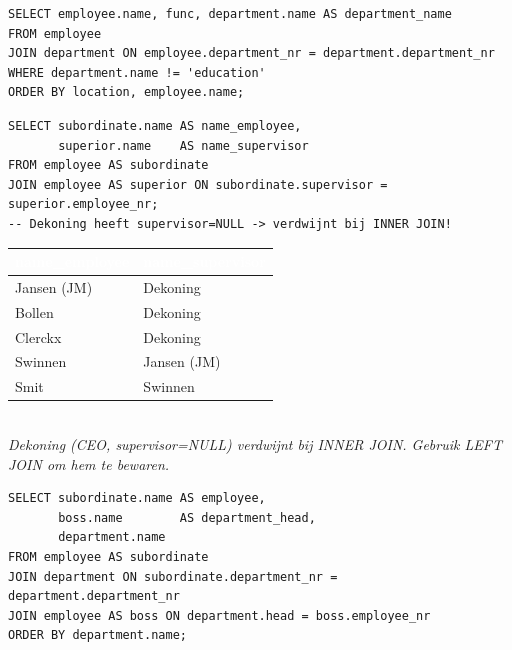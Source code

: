 \documentclass[10pt,a4paper]{article}
\newcommand{\TBLH}[1]{\textbf{\textcolor{white}{#1}}}
\begin{document}
\begin{tcolorbox}[sqlbox,title=Employees + department naam]
\begin{lstlisting}
SELECT employee.name, func, department.name AS department_name
FROM employee
JOIN department ON employee.department_nr = department.department_nr
WHERE department.name != 'education'
ORDER BY location, employee.name;
\end{lstlisting}
\end{tcolorbox}

\begin{tcolorbox}[sqlbox,title=Zelfrelatie --- employee met zijn supervisor (alias verplicht!)]
\begin{lstlisting}
SELECT subordinate.name AS name_employee,
       superior.name    AS name_supervisor
FROM employee AS subordinate
JOIN employee AS superior ON subordinate.supervisor = superior.employee_nr;
-- Dekoning heeft supervisor=NULL -> verdwijnt bij INNER JOIN!
\end{lstlisting}
\end{tcolorbox}

\begin{tcolorbox}[resbox,title=Resultaat zelfrelatie INNER JOIN (deel)]
{\scriptsize\begin{tabular}{|l|l|}
\hline
\rowcolor{tblhead}\TBLH{name\_employee} & \TBLH{name\_supervisor} \\ \hline
Jansen (JM) & Dekoning \\ \hline
\rowcolor{rowalt}
Bollen      & Dekoning \\ \hline
Clerckx     & Dekoning \\ \hline
\rowcolor{rowalt}
Swinnen     & Jansen (JM) \\ \hline
Smit        & Swinnen \\ \hline
\end{tabular}}\\[2pt]
\textit{Dekoning (CEO, supervisor=NULL) verdwijnt bij INNER JOIN. Gebruik LEFT JOIN om hem te bewaren.}
\end{tcolorbox}

\begin{tcolorbox}[sqlbox,title=3 tabellen joinen --- employee + department head]
\begin{lstlisting}
SELECT subordinate.name AS employee,
       boss.name        AS department_head,
       department.name
FROM employee AS subordinate
JOIN department ON subordinate.department_nr = department.department_nr
JOIN employee AS boss ON department.head = boss.employee_nr
ORDER BY department.name;
\end{lstlisting}
\end{tcolorbox}
\end{document}
